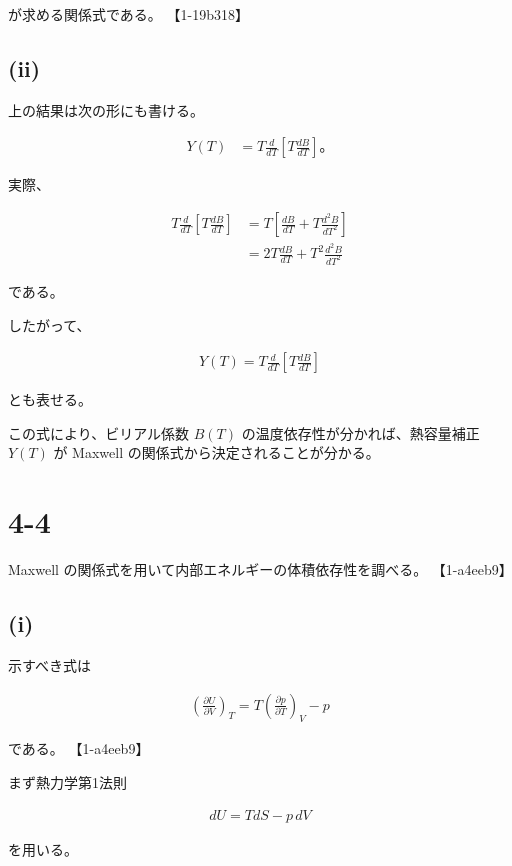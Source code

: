 \documentclass[platex,dvipdfmx,a4paper]{jsarticle}
\begin{document}
が求める関係式である。 【1-19b318】

\subsection{(ii)}

上の結果は次の形にも書ける。

\begin{align*}
Y(T)
&=
T
\frac{d}{dT}
\left[
T
\frac{dB}{dT}
\right]。
\end{align*}

実際、

\begin{align*}
T
\frac{d}{dT}
\left[
T
\frac{dB}{dT}
\right]
&=
T
\left[
\frac{dB}{dT}
+
T\frac{d^2B}{dT^2}
\right] \\
&=
2T\frac{dB}{dT}
+
T^2\frac{d^2B}{dT^2}
\end{align*}

である。

したがって、

\begin{align*}
Y(T)
=
T
\frac{d}{dT}
\left[
T
\frac{dB}{dT}
\right]
\end{align*}

とも表せる。

この式により、ビリアル係数 $B(T)$ の温度依存性が分かれば、熱容量補正 $Y(T)$ が Maxwell の関係式から決定されることが分かる。
\section{4-4}

Maxwell の関係式を用いて内部エネルギーの体積依存性を調べる。 【1-a4eeb9】

\subsection{(i)}

示すべき式は

\begin{align*}
\left(
\frac{\partial U}{\partial V}
\right)_T
=
T
\left(
\frac{\partial p}{\partial T}
\right)_V
-p
\end{align*}

である。 【1-a4eeb9】

まず熱力学第1法則

\begin{align*}
dU
=
TdS-p\,dV
\end{align*}

を用いる。
\end{document}
